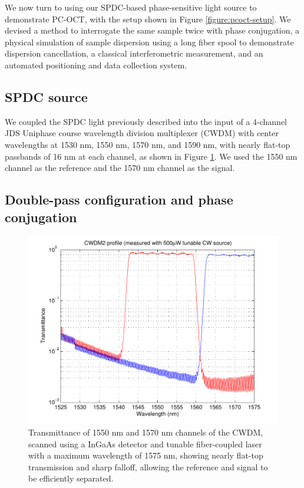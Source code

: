 We now turn to using our SPDC-based phase-sensitive light source to demonstrate PC-OCT, with the setup shown in Figure \ref{figure:pcoct-setup}. We devised a method to interrogate the same sample twice with phase conjugation, a physical simulation of sample dispersion using a long fiber spool to demonstrate dispersion cancellation, a classical interferometric measurement, and an automated positioning and data collection system.

\subsection{SPDC source}

We coupled the SPDC light previously described into the input of a 4-channel JDS Uniphase course wavelength division multiplexer (CWDM) with center wavelengths at 1530 nm, 1550 nm, 1570 nm, and 1590 nm, with nearly flat-top passbands of 16 nm at each channel, as shown in Figure \ref{figure:pcoct-cwdm}. We used the 1550 nm channel as the reference and the 1570 nm channel as the signal.

\subsection{Double-pass configuration and phase conjugation}

\begin{figure}[h]
\begin{center}
\includegraphics[width=12cm]{figure-pcoct-cwdm.pdf}
\caption{Transmittance of 1550 nm and 1570 nm channels of the CWDM, scanned using a InGaAs detector and tunable fiber-coupled laser with a maximum wavelength of 1575 nm, showing nearly flat-top transmission and sharp falloff, allowing the reference and signal to be efficiently separated.}
\label{figure:pcoct-cwdm}
\end{center}
\end{figure}

